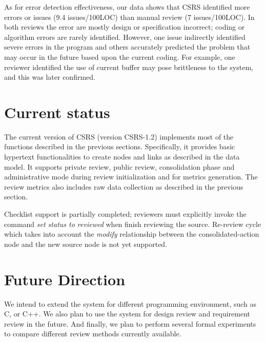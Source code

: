 As for error detection effectiveness, our data shows that CSRS
identified more errors or issues (9.4 issues/100LOC) than manual
review (7 issues/100LOC). In both reviews the error are mostly
design or specification incorrect; coding or algorithm errors are
rarely identified. However, one issue indirectly identified severe
errors in the program and others accurately predicted the problem that
may occur in the future based upon the current coding. For example, 
one reviewer identified the use of current buffer may pose
brittleness to the system, and this was later confirmed.


\section {Current status}

The current version of CSRS (version CSRS-1.2) implements most of the
functions described in the previous sections. Specifically, it
provides basic hypertext functionalities to create nodes and links as
described in the data model. It supports private review, public
review, consolidation phase and administrative mode during review
initialization and for metrics generation. The review metrics 
also includes raw data collection as described in the previous
section. 

Checklist support is partially completed; reviewers must explicitly
invoke the command {\sl set status to reviewed} when finish reviewing
the source. Re-review 
cycle which takes into account the {\sl modify} relationship between
the consolidated-action node and the new source node is not yet
supported.

\section {Future Direction}
We intend to extend the system for different programming environment,
such as C, or C++. We also plan to use the system for design review and
requirement review in the future. And finally, we plan to perform
several formal experiments to compare different review methods
currently available.

\newpage





